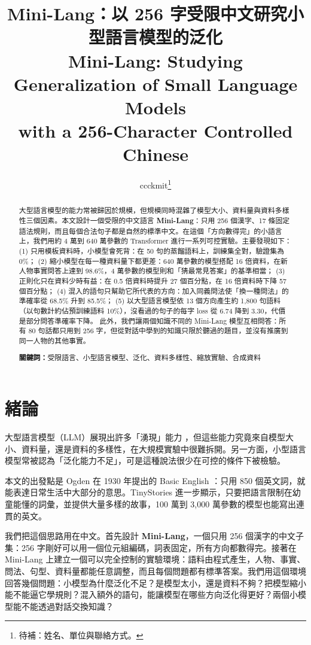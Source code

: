 \documentclass[11pt,a4paper]{article}
\title{\textbf{Mini-Lang：以 256 字受限中文研究小型語言模型的泛化}\\[0.6em]
\large Mini-Lang: Studying Generalization of Small Language Models\\ with a 256-Character Controlled Chinese}
\author{ccckmit\thanks{待補：姓名、單位與聯絡方式。}}
\date{}
\begin{document}
\maketitle

\begin{abstract}
大型語言模型的能力常被歸因於規模，但規模同時混雜了模型大小、資料量與資料多樣性三個因素。本文設計一個受限的中文語言 \textbf{Mini-Lang}：只用 256 個漢字、17 條固定語法規則，而且每個合法句子都是自然的標準中文。在這個「方向數得完」的小語言上，我們用約 4 萬到 640 萬參數的 Transformer 進行一系列可控實驗。主要發現如下：
(1) 只用模板資料時，小模型會死背：在 50 句的蒸餾語料上，訓練集全對，驗證集為 0\%；
(2) 縮小模型在每一種資料量下都更差：640 萬參數的模型搭配 16 倍資料，在新人物事實問答上達到 98.6\%，4 萬參數的模型則和「猜最常見答案」的基準相當；
(3) 正則化只在資料少時有益：在 0.5 倍資料時提升 27 個百分點，在 16 倍資料時下降 57 個百分點；
(4) 混入的語句只幫助它所代表的方向：加入同義問法使「換一種問法」的準確率從 68.5\% 升到 85.5\%；
(5) 以大型語言模型依 13 個方向產生約 1,800 句語料（以句數計約佔預訓練語料 10\%），沒看過的句子的每字 loss 從 6.74 降到 3.30，代價是部分問答準確率下降。
此外，我們讓兩個知識不同的 Mini-Lang 模型互相問答：所有 80 句話都只用到 256 字，但從對話中學到的知識只限於聽過的題目，並沒有推廣到同一人物的其他事實。

\medskip
\noindent\textbf{關鍵詞：}受限語言、小型語言模型、泛化、資料多樣性、縮放實驗、合成資料
\end{abstract}

\section{緒論}

大型語言模型（LLM）展現出許多「湧現」能力 \cite{wei2022emergent}，但這些能力究竟來自模型大小、資料量，還是資料的多樣性，在大規模實驗中很難拆開。另一方面，小型語言模型常被認為「泛化能力不足」，可是這種說法很少在可控的條件下被檢驗。

本文的出發點是 Ogden 在 1930 年提出的 Basic English \cite{ogden1930basic}：只用 850 個英文詞，就能表達日常生活中大部分的意思。TinyStories \cite{eldan2023tinystories} 進一步顯示，只要把語言限制在幼童能懂的詞彙，並提供大量多樣的故事，100 萬到 3,000 萬參數的模型也能寫出連貫的英文。

我們把這個思路用在中文。首先設計 \textbf{Mini-Lang}，一個只用 256 個漢字的中文子集：256 字剛好可以用一個位元組編碼，詞表固定，所有方向都數得完。接著在 Mini-Lang 上建立一個可以完全控制的實驗環境：語料由程式產生，人物、事實、問法、句型、資料量都能任意調整，而且每個問題都有標準答案。我們用這個環境回答幾個問題：小模型為什麼泛化不足？是模型太小，還是資料不夠？把模型縮小能不能逼它學規則？混入額外的語句，能讓模型在哪些方向泛化得更好？兩個小模型能不能透過對話交換知識？
\end{document}
